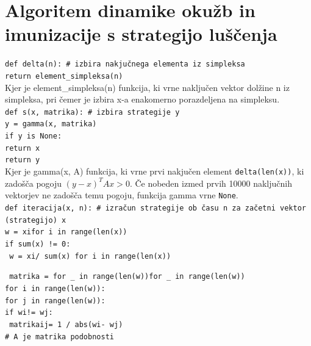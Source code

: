 \documentclass[a4paper]{article}
\begin{document}
\section{Algoritem dinamike okužb in imunizacije s strategijo luščenja}
\texttt{def delta(n):    \# izbira nakjučnega elementa iz simpleksa}\\
\hspace*{1cm}\texttt{return element\_simpleksa(n)}\newline \\
Kjer je element\_simpleksa(n) funkcija, ki vrne naključen vektor dolžine n iz simpleksa, pri čemer je izbira x-a enakomerno porazdeljena na simpleksu.\newline \\
\texttt{def s(x, matrika):  \# izbira strategije y}\\
\hspace*{1cm}\texttt{y = gamma(x, matrika)}\\
\hspace*{1cm}\texttt{if y is None:}\\
\hspace*{2cm}\texttt{return x}\\
\hspace*{1cm}\texttt{return y}\newline \\
Kjer je gamma(x, A) funkcija, ki vrne prvi nakjučen element \texttt{delta(len(x))}, ki zadošča pogoju $(y-x)^TAx > 0$. Če nobeden izmed prvih 10000 naključnih vektorjev ne zadošča temu pogoju, funkcija gamma vrne \texttt{None}.\newline \\

\texttt{def iteracija(x, n):  \# izračun strategije ob času n za začetni vektor (strategijo) x}\\
\hspace*{1cm}\texttt{w = \lbrack x\lbrack i\rbrack  for i in range(len(x))\rbrack }\\
\hspace*{1cm}\texttt{if sum(x) != 0:}\\
\hspace*{2cm}\texttt{ w = \lbrack x\lbrack i\rbrack  / sum(x) for i in range(len(x))\rbrack }

\hspace*{1cm}\texttt{ matrika = \lbrack {} for \_ in range(len(w))\rbrack  for \_ in range(len(w))\rbrack }\\
\hspace*{1cm}\texttt{for i in range(len(w)):}\\
\hspace*{2cm}\texttt{for j in range(len(w)):}\\
\hspace*{3cm}\texttt{if w\lbrack i\rbrack != w\lbrack j\rbrack:}\\
\hspace*{4cm}\texttt{   matrika\lbrack i\rbrack\lbrack j\rbrack = 1 / abs(w\lbrack i\rbrack - w\lbrack j\rbrack)}\\
\hspace*{1cm}\texttt{\# A je matrika podobnosti}\\
\end{document}
